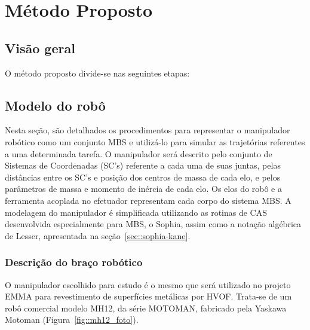 \chapter{Método Proposto}



\section{Visão geral}

O método proposto divide-se nas seguintes etapas:



\section{Modelo do robô}

Nesta seção, são detalhados os procedimentos para representar o manipulador
robótico como um conjunto MBS e utilizá-lo para simular as trajetórias
referentes a uma determinada tarefa. O manipulador será descrito pelo conjunto
de Sistemas de Coordenadas (SC's) referente a cada uma de suas juntas, pelas
distâncias entre os SC's e posição dos centros de massa de cada elo, e pelos
parâmetros de massa e momento de inércia de cada elo. Os elos do robô e a
ferramenta acoplada no efetuador representam cada corpo do sistema MBS. A
modelagem do manipulador é simplificada utilizando as rotinas de CAS
desenvolvida especialmente para MBS, o Sophia, assim como a notação algébrica de
Lesser, apresentada na seção~\ref{sec::sophia-kane}.

\subsection{Descrição do braço robótico}

O manipulador escolhido para estudo é o mesmo que será utilizado no projeto EMMA
para revestimento de superfícies metálicas por HVOF. Trata-se de um robô
comercial modelo MH12, da série MOTOMAN, fabricado pela Yaskawa Motoman
(Figura~\ref{fig::mh12_foto}).

